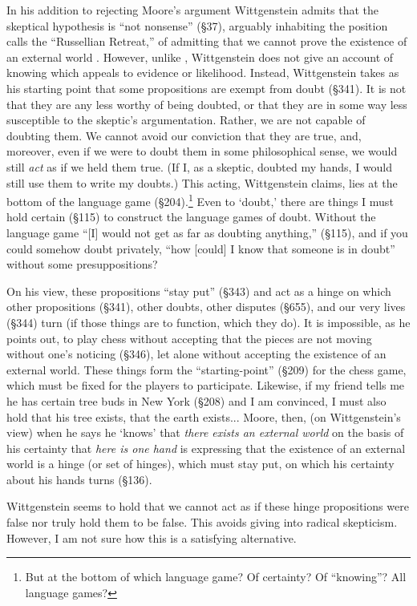 \documentclass[man,12pt,natbib]{apa6}
\begin{document}
In his addition to rejecting Moore's argument Wittgenstein admits that the
skeptical hypothesis is ``not nonsense'' (\S 37), arguably inhabiting the
position \citet{Wright91} calls the ``Russellian Retreat,'' of admitting that
we cannot prove the existence of an external world \cite{Robinson}.  However,
unlike \citet{Russell12}, Wittgenstein does not give an account of knowing
which appeals to evidence or likelihood.  Instead, Wittgenstein takes as his
starting point that some propositions are exempt from doubt (\S 341). It is not
that they are any less worthy of being doubted, or that they are in some way
less susceptible to the skeptic's argumentation. Rather, we are not capable of
doubting them. We cannot avoid our conviction that they are true, and,
moreover, even if we were to doubt them in some philosophical sense, we would
still \emph{act} as if we held them true.  (If I, as a skeptic, doubted my
hands, I would still use them to write my doubts.) This acting, Wittgenstein
claims, lies at the bottom of the language game (\S 204).\footnote{But at the
bottom of which language game? Of certainty?  Of ``knowing''? All language
games?}
Even to `doubt,' there are things I must hold certain (\S 115) to construct the
language games of doubt. Without the language game ``[I] would not get as far
as doubting anything,'' (\S 115), and if you could somehow doubt privately,
``how [could] I know that someone is in doubt'' without some presuppositions?

On his view, these propositions ``stay put'' (\S 343) and act as a hinge on
which other propositions (\S 341), other doubts, other disputes (\S 655), and
our very lives (\S 344) turn (if those things are to function, which they do).
It is impossible, as he points out, to play chess without accepting that the
pieces are not moving without one's noticing (\S 346), let alone without
accepting the existence of an external world. These things form the
``starting-point'' (\S 209) for the chess game, which must be fixed for the
players to participate. Likewise, if my friend tells me he has certain tree
buds in New York (\S 208) and I am convinced, I must also hold that his tree
exists, that the earth exists...
Moore, then, (on Wittgenstein's view) when he says he `knows' that \emph{there
exists an external world} on the basis of his certainty that \emph{here is one
hand} is expressing that the existence of an external world is a hinge (or set
of hinges), which must stay put, on which his certainty about his hands turns
(\S 136).

Wittgenstein seems to hold that we cannot act as if these hinge propositions
were false nor truly hold them to be false. This avoids giving into radical
skepticism. However, I am not sure how this is a satisfying alternative.

\clearpage

\end{document}
